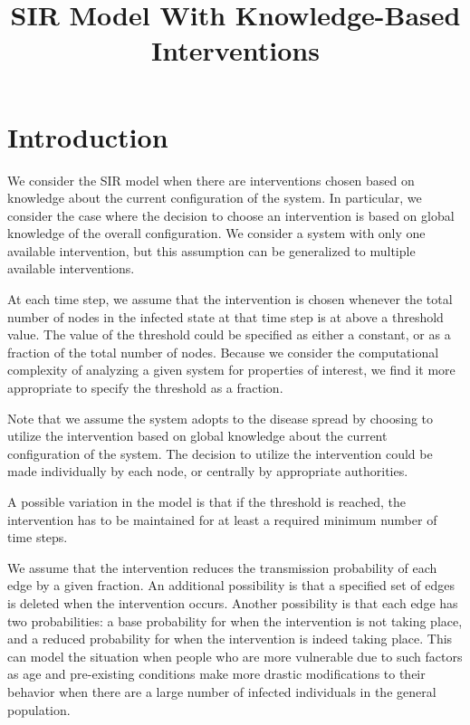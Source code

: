 \documentclass[11pt]{article}
\title{\textbf{SIR Model With Knowledge-Based Interventions}}
\author{  
\vspace*{1ex}  
}
\begin{document}
 
 
\maketitle  
 
\normalbaselineskip

\section{Introduction}
  
  We consider the SIR model when there are interventions chosen based on 
  knowledge about the current configuration of the system.
  In particular, we consider the case where the decision to choose an intervention is based on 
  global knowledge of the overall configuration.
  We consider a system with only one available intervention, 
  but this assumption can be generalized to multiple available interventions.
  
  At each time step, we assume that the intervention is chosen whenever the total number of nodes 
  in the infected state at that time step is at above a threshold value.
  The value of the threshold could be specified as either a constant,
  or as a fraction of the total number of nodes.
  Because we consider the computational complexity of analyzing a given system for properties of interest,
  we find it more appropriate to specify the threshold as a fraction.
  
  Note that we assume the system adopts to the disease spread by choosing to utilize the intervention based on 
  global knowledge about the current configuration of the system.
  The decision to utilize the intervention could be made individually by each node,
  or centrally by appropriate authorities.
  
  A possible variation in the model is that if the threshold is reached, the intervention has to be maintained for 
  at least a required minimum number of time steps.
  
  We assume that the intervention reduces the transmission probability of each edge by a given fraction.
  An additional possibility is that a specified set of edges is deleted when the intervention occurs.
  Another possibility is that each edge has two probabilities:
  a base probability for when the intervention is not taking place,
  and a reduced probability for when the intervention is indeed taking place.
  This can model the situation when people who are more vulnerable 
  due to such factors as age and pre-existing conditions
  make more drastic modifications to their behavior when 
  there are a large number of infected individuals in the general population.
  
\end{document}
